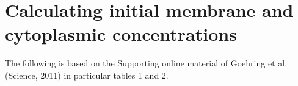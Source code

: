\documentclass[a4paper,oneside,12pt]{article}
\begin{document}
\pagestyle{empty}%
\setcounter{page}{1}
\section*{Calculating initial membrane and cytoplasmic concentrations}
The following is based on the Supporting online material of Goehring et al. (Science, 2011) in particular tables 1 and 2.
\end{document}
